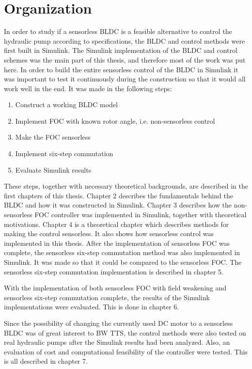 \documentclass{LTHthesis}
\begin{document}
\section{Organization}
In order to study if a sensorless BLDC is a feasible alternative to control the hydraulic pump according to specifications, the BLDC and control methods were first built in Simulink. The Simulink implementation of the BLDC and control schemes was the main part of this thesis, and therefore most of the work was put here. In order to build the entire sensorless control of the BLDC in Simulink it was important to test it continuously during the construction so that it would all work well in the end. It was made in the following steps:
\begin{enumerate}
\item Construct a working BLDC model
\item Implement FOC with known rotor angle, i.e. non-sensorless control
\item Make the FOC sensorless
\item Implement six-step commutation
\item Evaluate Simulink results
\end{enumerate}
These steps, together with necessary theoretical backgrounds, are described in the first chapters of this thesis. Chapter 2 describes the fundamentals behind the BLDC and how it was constructed in Simulink.
Chapter 3 describes how the non-sensorless FOC controller was implemented in Simulink, together with theoretical motivations.
Chapter 4 is a theoretical chapter which describes methods for making the control sensorless. It also shows how sensorless control was implemented in this thesis.
After the implementation of sensorless FOC was complete, the sensorless six-step commutation method was also implemented in Simulink. It was made so that it could be compared to the sensorless FOC. The sensorless six-step commutation implementation is described in chapter 5.

With the implementation of both sensorless FOC with field weakening and sensorless six-step commutation complete, the results of the Simulink implementations were evaluated. This is done in chapter 6.

Since the possibility of changing the currently used DC motor to a sensorless BLDC was of great interest to BW TTS, the control methods were also tested on real hydraulic pumps after the Simulink results had been analyzed. Also, an evaluation of cost and computational feasibility of the controller were tested. This is all described in chapter 7.
\end{document}
